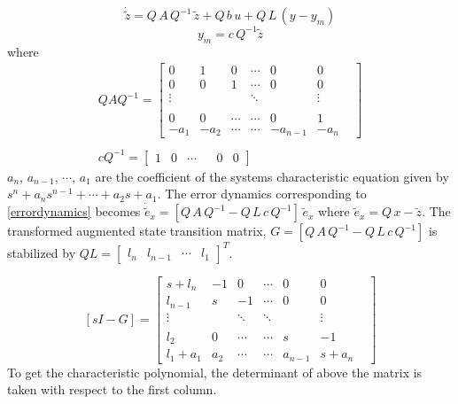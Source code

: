 \documentclass{elsarticle}
\numberwithin{equation}{section}
\begin{document}
\begin{equation}
	\dot{\widetilde{z}}=Q\,A\,Q^{-1}\,\widetilde{z} + Q\,b\,u +Q\,L\,(y-y_m)
\end{equation}
\vspace{-.5cm}
\begin{equation}
	y_m=c\,Q^{-1}\widetilde{z}
\end{equation}
where
\begin{equation}\label{observersingle}
	\begin{split}
	{	
	QAQ^{-1}= \begin{bmatrix}
   	0 & 1 & 0 &\cdots& 0 & 0 \\
	0 & 0 & 1 &\cdots& 0 & 0 \\
	\vdots& & &\ddots&   &\vdots& \\
	\\
	0 & 0 &\cdots&\cdots& 0 & 1 \\
	-a_1& -a_2 &\cdots&\cdots& -a_{n-1} & -a_n
	\end{bmatrix} 
	} \\\\
	\hspace{0cm}
	{
	cQ^{-1}= \begin{bmatrix}
   	1 &	0 & \cdots & & 0 & 0
	\end{bmatrix}
	}
	\end{split}
\end{equation}
$a_{n}$, $a_{n-1}$, $\cdots$, $a_1$ are the coefficient of the systems characteristic equation given by $s^{n}+a_{n}s^{n-1}+\cdots+a_{2}s+a_{1}$. The error dynamics corresponding to \eqref{errordynamics} becomes $\dot{\widetilde{e}}_x=[Q\,A\,Q^{-1}- Q\,L\,c\,Q^{-1}]\,\widetilde{e}_x$ where $\widetilde{{e}}_x = Q\,x - \widetilde{z}$. The transformed augmented state transition matrix, $G=[Q\,A\,Q^{-1}- Q\,L\,c\,Q^{-1}]$ is stabilized by $QL=\begin{bmatrix}
l_n & l_{n-1} &\cdots& l_1 \end{bmatrix}^T$. 

\[
	[sI{{-}}G]= \begin{bmatrix}
   	s+{{l}}_n & {{-}}1 & 0 &\cdots& 0 & 0 \\
	l_{n-1} & s & {{-}}1 &\cdots& 0 & 0 \\
	\vdots& &\ddots &\ddots&   &\vdots& \\
	\\
	l_{2} & 0 &\cdots&\cdots& s & {{-}}1 \\
	l_1{{+}}a_1& a_2 &\cdots&\cdots& a_{n-1} & s{{+}}a_n
	\end{bmatrix}
\]  
To get the characteristic polynomial, the determinant of above the matrix is taken with respect to the first column. 
\end{document}
